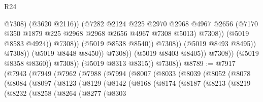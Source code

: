 \begin{lexlean}{R24}
\begin{coremodule}
                                                    @7308)
                                                  (@3620 @2116))
                                                (@7282
                                                  @2124
                                                  @225
                                                  @2970
                                                  @2968
                                                  @4967
                                                  @2656
                                                  (@7170
                                                    @350
                                                    @1879
                                                    @225
                                                    @2968
                                                    @2968
                                                    @2656
                                                    @4967
                                                    @7308
                                                    @5013)
                                                  @7308))
                                              (@5019 @8583 @4924))
                                            @7308))
                                        (@5019 @8538 @8540))
                                      @7308))
                                  (@5019 @8493 @8495))
                                @7308))
                            (@5019 @8448 @8450))
                          @7308))
                      (@5019 @8403 @8405))
                    @7308))
                (@5019 @8358 @8360))
              @7308))
          (@5019 @8313 @8315))
        @7308))
@8789 := @7917
    (@7943
      (@7949
        (@7962
          (@7988
            (@7994
              (@8007
                (@8033
                  (@8039
                    (@8052
                      (@8078
                        (@8084
                          (@8097
                            (@8123
                              (@8129
                                (@8142
                                  (@8168
                                    (@8174
                                      (@8187
                                        (@8213
                                          (@8219
                                            (@8232
                                              (@8258
                                                (@8264
                                                  (@8277
                                                    (@8303

\end{coremodule}
\end{lexlean}
